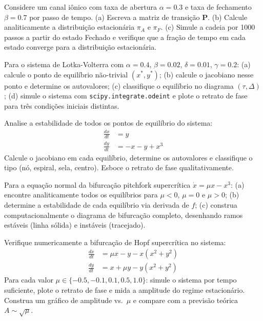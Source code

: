 \begin{exercicio}
Considere um canal iônico com taxa de abertura $\alpha = 0.3$ e taxa de fechamento
$\beta = 0.7$ por passo de tempo. (a) Escreva a matriz de transição $\mathbf{P}$.
(b) Calcule analiticamente a distribuição estacionária $\pi_A$ e $\pi_F$.
(c) Simule a cadeia por 1000 passos a partir do estado Fechado e verifique que a
fração de tempo em cada estado converge para a distribuição estacionária.
\end{exercicio}

\begin{exercicio}
Para o sistema de Lotka-Volterra com $\alpha = 0.4$, $\beta = 0.02$, $\delta = 0.01$,
$\gamma = 0.2$: (a) calcule o ponto de equilíbrio não-trivial $(x^*, y^*)$; (b) calcule
o jacobiano nesse ponto e determine os autovalores; (c) classifique o equilíbrio no
diagrama $(\tau, \Delta)$; (d) simule o sistema com \texttt{scipy.integrate.odeint} e
plote o retrato de fase para três condições iniciais distintas.
\end{exercicio}

\begin{exercicio}
Analise a estabilidade de todos os pontos de equilíbrio do sistema:
\begin{align*}
  \frac{dx}{dt} &= y \\
  \frac{dy}{dt} &= -x - y + x^3
\end{align*}
Calcule o jacobiano em cada equilíbrio, determine os autovalores e classifique o tipo
(nó, espiral, sela, centro). Esboce o retrato de fase qualitativamente.
\end{exercicio}

\begin{exercicio}
Para a equação normal da bifurcação pitchfork supercrítica $\dot{x} = \mu x - x^3$:
(a) encontre analiticamente todos os equilíbrios para $\mu < 0$, $\mu = 0$ e $\mu > 0$;
(b) determine a estabilidade de cada equilíbrio via derivada de $f$; (c) construa
computacionalmente o diagrama de bifurcação completo, desenhando ramos estáveis (linha
sólida) e instáveis (tracejado).
\end{exercicio}

\begin{exercicio}
Verifique numericamente a bifurcação de Hopf supercrítica no sistema:
\begin{align*}
  \frac{dx}{dt} &= \mu x - y - x(x^2 + y^2) \\
  \frac{dy}{dt} &= x + \mu y - y(x^2 + y^2)
\end{align*}
Para cada valor $\mu \in \{-0.5, -0.1, 0.1, 0.5, 1.0\}$: simule o sistema por tempo
suficiente, plote o retrato de fase e mida a amplitude do regime estacionário. Construa
um gráfico de amplitude vs.\ $\mu$ e compare com a previsão teórica $A \sim \sqrt{\mu}$.
\end{exercicio}

